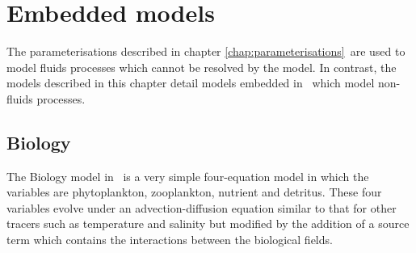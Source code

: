\chapter{Embedded models}\label{chap:embedded}

The parameterisations described in chapter \ref{chap:parameterisations}\ are
used to model fluids processes which cannot be resolved by the model. In
contrast, the models described in this chapter detail models embedded in
\fluidity\ which model non-fluids processes.

\section{Biology}
\label{sect:biology_model}
The Biology model in \fluidity\ is a very simple four-equation model in
which the variables are phytoplankton, zooplankton, nutrient and detritus.
These four variables evolve under an advection-diffusion equation similar to
that for other tracers such as temperature and salinity but modified by the
addition of a source term which contains the interactions between the
biological fields.

